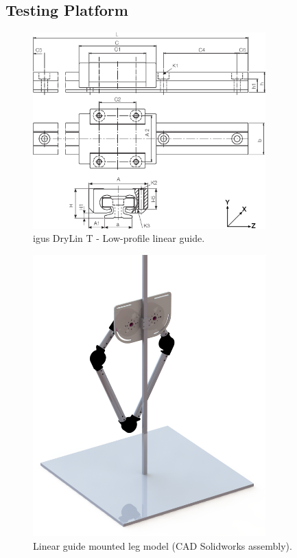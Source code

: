\subsection{Testing Platform}
\label{subsec:Testing Platform}


\begin{figure}
\centering
\includegraphics[width=0.8\textwidth]{images/mechanical/drylin-linear-guide.png} 
\caption{igus DryLin T - Low-profile linear guide.}
\label{fig:drylin-linear-guide}
\end{figure}


\begin{figure}
\centering
\includegraphics[width=0.8\textwidth]{images/mechanical/back-shot.png} 
\caption{Linear guide mounted leg model (CAD Solidworks assembly).}
\label{fig:Linear guide mounted leg model}
\end{figure}


